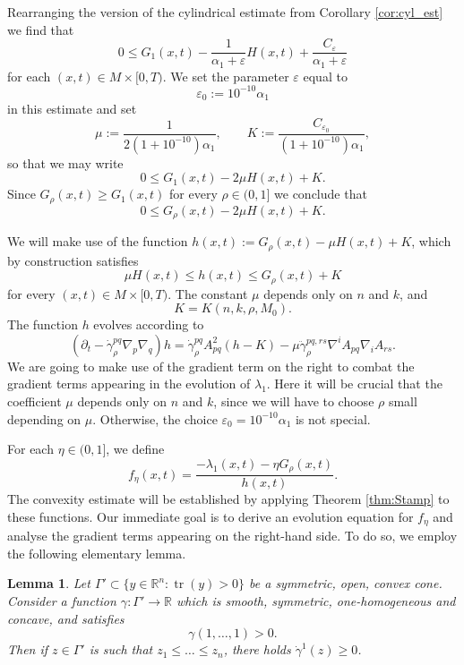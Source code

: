 \documentclass[12pt]{amsart}
\newtheorem{lemma}[theorem]{Lemma}
\DeclareMathOperator{\tr}{tr}
\begin{document}
Rearranging the version of the cylindrical estimate from Corollary \ref{cor:cyl_est} we find that 
\[ 0 \leq G_1(x,t) - \frac{1}{\alpha_1 +\varepsilon} H(x,t) + \frac{C_\varepsilon}{\alpha_1+\varepsilon} \]
for each $(x,t) \in M\times [0,T)$. We set the parameter $\varepsilon$ equal to 
\[\varepsilon_0 := 10^{-10}\alpha_1\] 
in this estimate and set 
\[\mu := \frac{1}{2(1+ 10^{-10}) \alpha_1}, \qquad K:= \frac{C_{\varepsilon_0}}{(1+10^{-10})\alpha_1},\]
so that we may write
\[0 \leq G_1(x,t) - 2 \mu H(x,t) + K.\]
Since $G_\rho(x,t) \geq G_1(x,t)$ for every $\rho \in (0,1]$ we conclude that 
\[0 \leq G_\rho(x,t) - 2 \mu H(x,t) + K.\]

We will make use of the function $h(x,t):= G_\rho(x,t) - \mu H(x,t) +K$, which by construction satisfies
\[\mu H(x,t) \leq h(x,t) \leq G_\rho(x,t) + K\]
for every $(x,t) \in M \times[0,T)$. The constant $\mu$ depends only on $n$ and $k$, and
\[K = K(n, k,\rho, M_0).\]
The function $h$ evolves according to 
\[(\partial_t - \dot \gamma_{\rho}^{pq} \nabla_p \nabla_q )h = \dot \gamma_\rho^{pq} A^2_{pq} (h - K) - \mu \ddot \gamma_\rho^{pq,rs}  \nabla^i A_{pq} \nabla_i A_{rs}.\]
We are going to make use of the gradient term on the right to combat the gradient terms appearing in the evolution of $\lambda_1$. Here it will be crucial that the coefficient $\mu$ depends only on $n$ and $k$, since we will have to choose $\rho$ small depending on $\mu$. Otherwise, the choice $\varepsilon_0 = 10^{-10}\alpha_1$ is not special. 

For each $\eta \in(0,1]$, we define
\[f_\eta (x,t) = \frac{-\lambda_1(x,t) - \eta G_\rho(x,t)}{h(x,t)}.\]
The convexity estimate will be established by applying Theorem \ref{thm:Stamp} to these functions. Our immediate goal is to derive an evolution equation for $f_\eta$ and analyse the gradient terms appearing on the right-hand side. To do so, we employ the following elementary lemma.

\begin{lemma}
Let $\Gamma' \subset \{y \in \mathbb{R}^n : \tr(y) >0 \}$ be a symmetric, open, convex cone. Consider a function $\gamma:\Gamma' \to \mathbb{R}$ which is smooth, symmetric, one-homogeneous and concave, and satisfies
\[\gamma(1,\dots,1) >0.\]
Then if
$z \in \Gamma'$ is such that $z_1 \leq \dots \leq z_n$, there holds $\dot \gamma^1(z) \geq 0$. 
\end{lemma}
\end{document}
